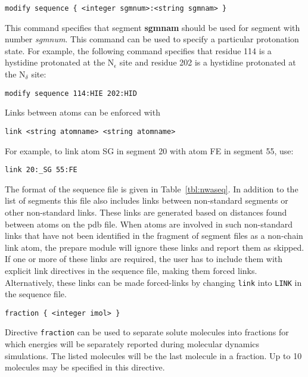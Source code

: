 \begin{verbatim}
modify sequence { <integer sgmnum>:<string sgmnam> }
\end{verbatim}

This command specifies that segment {\bf sgmnam} should be used
for segment with number {\it sgmnum}. This command can be used
to specify a particular protonation state. For example, the
following command specifies that residue 114 is a hystidine
protonated at the N$_\epsilon$ site and residue 202 is a hystidine
protonated at the N$_\delta$ site:

\begin{verbatim}
modify sequence 114:HIE 202:HID
\end{verbatim}

Links between atoms can be enforced with

\begin{verbatim}
link <string atomname> <string atomname>
\end{verbatim}

For example, to link atom {\rm SG} in segment 20 with atom {\rm FE}
in segment 55, use:

\begin{verbatim}
link 20:_SG 55:FE
\end{verbatim}

\par
The format of the sequence file is given in Table~\ref{tbl:nwaseq}.
In addition to the list of segments this file also includes links
between non-standard segments or other non-standard links. 
These links are generated based on distances found between
atoms on the pdb file. When atoms are involved in such non-standard 
links that have not been identified in the fragment of segment
files as a non-chain link atom, the prepare module will ignore
these links and report them as skipped. If one or more of these links
are required, the user has to include them with explicit link
directives in the sequence file, making them forced links.
Alternatively, these links can be made forced-links by changing 
\verb+link+ into \verb+LINK+ in the sequence file. 

\begin{verbatim}
fraction { <integer imol> }
\end{verbatim}

Directive \verb+fraction+ can be used to separate solute molecules
into fractions for which energies will be separately reported 
during molecular dynamics simulations. The listed molecules will be
the last molecule in a fraction. Up to 10 molecules may be
specified in this directive.

